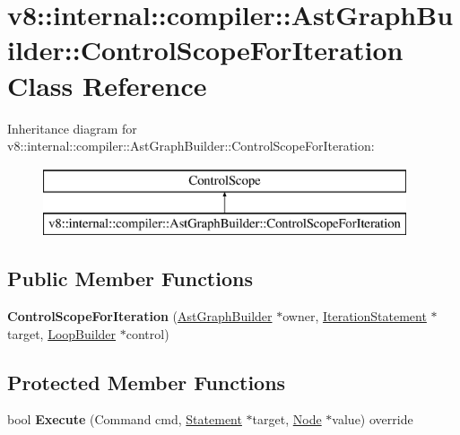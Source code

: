 \hypertarget{classv8_1_1internal_1_1compiler_1_1_ast_graph_builder_1_1_control_scope_for_iteration}{}\section{v8\+:\+:internal\+:\+:compiler\+:\+:Ast\+Graph\+Builder\+:\+:Control\+Scope\+For\+Iteration Class Reference}
\label{classv8_1_1internal_1_1compiler_1_1_ast_graph_builder_1_1_control_scope_for_iteration}
Inheritance diagram for v8\+:\+:internal\+:\+:compiler\+:\+:Ast\+Graph\+Builder\+:\+:Control\+Scope\+For\+Iteration\+:\begin{figure}[H]
\begin{center}
\leavevmode
\includegraphics[height=2.000000cm]{classv8_1_1internal_1_1compiler_1_1_ast_graph_builder_1_1_control_scope_for_iteration}
\end{center}
\end{figure}
\subsection*{Public Member Functions}
\begin{DoxyCompactItemize}
\item 
{\bfseries Control\+Scope\+For\+Iteration} (\hyperlink{classv8_1_1internal_1_1compiler_1_1_ast_graph_builder}{Ast\+Graph\+Builder} $\ast$owner, \hyperlink{classv8_1_1internal_1_1_iteration_statement}{Iteration\+Statement} $\ast$target, \hyperlink{classv8_1_1internal_1_1compiler_1_1_loop_builder}{Loop\+Builder} $\ast$control)\hypertarget{classv8_1_1internal_1_1compiler_1_1_ast_graph_builder_1_1_control_scope_for_iteration_a9a16763a619c408926a54e639ed9faa0}{}\label{classv8_1_1internal_1_1compiler_1_1_ast_graph_builder_1_1_control_scope_for_iteration_a9a16763a619c408926a54e639ed9faa0}

\end{DoxyCompactItemize}
\subsection*{Protected Member Functions}
\begin{DoxyCompactItemize}
\item 
bool {\bfseries Execute} (Command cmd, \hyperlink{classv8_1_1internal_1_1_statement}{Statement} $\ast$target, \hyperlink{classv8_1_1internal_1_1compiler_1_1_node}{Node} $\ast$value) override\hypertarget{classv8_1_1internal_1_1compiler_1_1_ast_graph_builder_1_1_control_scope_for_iteration_a12540788d1b6e6f6bd85b945bc073465}{}\label{classv8_1_1internal_1_1compiler_1_1_ast_graph_builder_1_1_control_scope_for_iteration_a12540788d1b6e6f6bd85b945bc073465}

\end{DoxyCompactItemize}
